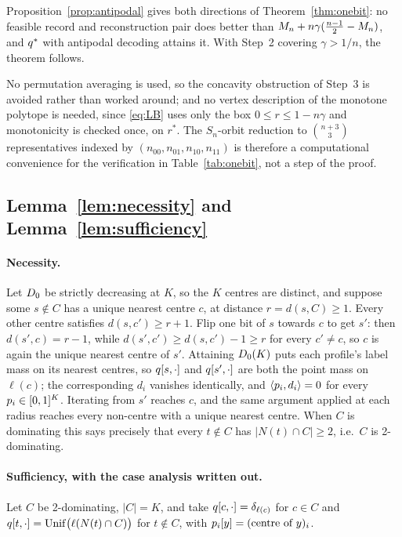 Proposition~\ref{prop:antipodal} gives both directions of
Theorem~\ref{thm:onebit}: no feasible record and reconstruction pair does better
than $M_n + n\gamma(\frac{n-1}{2}-M_n)$, and $q^\ast$ with antipodal decoding
attains it. With Step~2 covering $\gamma > 1/n$, the theorem follows.

\begin{remark}
\label{rem:notneeded}
No permutation averaging is used, so the concavity obstruction of Step~3 is
avoided rather than worked around; and no vertex description of the monotone
polytope is needed, since \eqref{eq:LB} uses only the box
$0 \le r \le 1-n\gamma$ and monotonicity is checked once, on $r^\ast$. The
$S_n$-orbit reduction to $\binom{n+3}{3}$ representatives indexed by
$(n_{00},n_{01},n_{10},n_{11})$ is therefore a computational convenience for the
verification in Table~\ref{tab:onebit}, not a step of the proof.
\end{remark}

\subsection{Lemma~\ref{lem:necessity} and Lemma~\ref{lem:sufficiency}}
\label{app:threshold}

\paragraph{Necessity.}
Let $D_0$ be strictly decreasing at $K$, so the $K$ centres are distinct, and
suppose some $s \notin C$ has a unique nearest centre $c$, at distance
$r = d(s,C) \ge 1$. Every other centre satisfies $d(s,c') \ge r+1$. Flip one bit
of $s$ towards $c$ to get $s'$: then $d(s',c) = r-1$, while
$d(s',c') \ge d(s,c') - 1 \ge r$ for every $c' \ne c$, so $c$ is again the unique
nearest centre of $s'$. Attaining $D_0(K)$ puts each profile's label mass on
its nearest centres, so $q[s,\cdot]$ and $q[s',\cdot]$ are both the point
mass on $\ell(c)$; the corresponding $d_i$ vanishes identically, and
$\langle p_i, d_i \rangle = 0$ for every $p_i \in [0,1]^K$. Iterating from
$s'$ reaches $c$, and the same argument applied at each radius reaches every
non-centre with a unique nearest centre. When $C$ is dominating this says
precisely that every $t \notin C$ has $|N(t) \cap C| \ge 2$, i.e.\ $C$ is
2-dominating.

\paragraph{Sufficiency, with the case analysis written out.}
Let $C$ be 2-dominating, $|C| = K$, and take
$q[c,\cdot] = \delta_{\ell(c)}$ for $c \in C$ and
$q[t,\cdot] = \mathrm{Unif}\bigl(\ell(N(t)\cap C)\bigr)$ for $t \notin C$,
with $p_i[y] = (\text{centre of } y)_i$.

